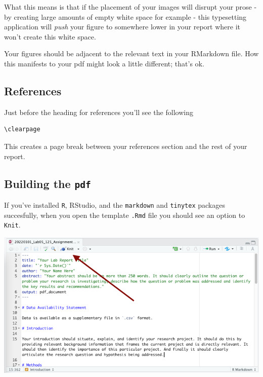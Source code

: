 \documentclass[
]{book}
\begin{document}
What this means is that if the placement of your images will disrupt your prose - by creating large amounts of empty white space for example - this typesetting application will \emph{push} your figure to somewhere lower in your report where it won't create this white space.

Your figures should be adjacent to the relevant text in your RMarkdown file. How this manifests to your pdf might look a little different; that's ok.

\hypertarget{references}{%
\subsection*{References}\label{references}}

Just before the heading for references you'll see the following

\begin{verbatim}
\clearpage
\end{verbatim}

This creates a page break between your references section and the rest of your report.

\hypertarget{building-the-pdf}{%
\subsection*{\texorpdfstring{Building the \texttt{pdf}}{Building the pdf}}\label{building-the-pdf}}

If you've installed \texttt{R}, RStudio, and the \texttt{markdown} and \texttt{tinytex} packages succesfully, when you open the template \texttt{.Rmd} file you should see an option to \texttt{Knit}.

\includegraphics{images/Knit_20220101.png}
\end{document}
